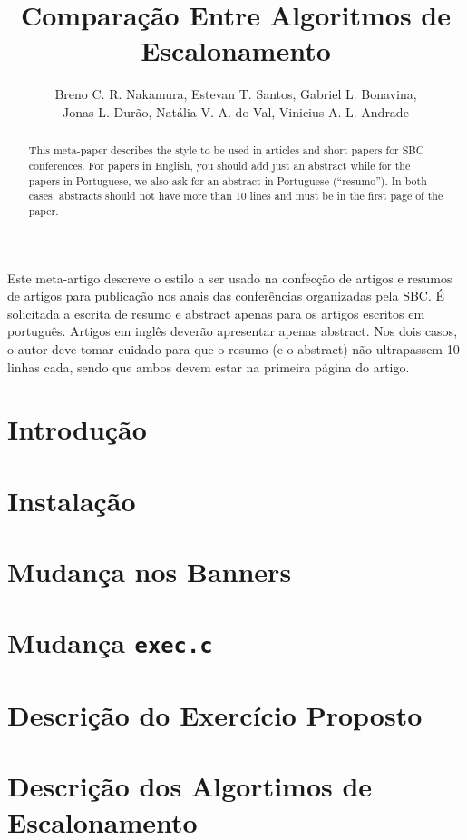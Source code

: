 \documentclass[12pt]{article}
\title{Comparação Entre Algoritmos de Escalonamento}
\author{Breno C. R. Nakamura\inst{1}, Estevan T. Santos\inst{1}, Gabriel L. Bonavina\inst{1}, \\
Jonas L. Durão\inst{1}, Natália V. A. do Val\inst{1}, Vinicius A. L. Andrade\inst{1}}
\begin{document}
 

\maketitle

\begin{abstract}
  This meta-paper describes the style to be used in articles and short papers
  for SBC conferences. For papers in English, you should add just an abstract
  while for the papers in Portuguese, we also ask for an abstract in
  Portuguese (``resumo''). In both cases, abstracts should not have more than
  10 lines and must be in the first page of the paper.
\end{abstract}
     
\begin{resumo} 
  Este meta-artigo descreve o estilo a ser usado na confecção de artigos e
  resumos de artigos para publicação nos anais das conferências organizadas
  pela SBC. É solicitada a escrita de resumo e abstract apenas para os artigos
  escritos em português. Artigos em inglês deverão apresentar apenas abstract.
  Nos dois casos, o autor deve tomar cuidado para que o resumo (e o abstract)
  não ultrapassem 10 linhas cada, sendo que ambos devem estar na primeira
  página do artigo.
\end{resumo}

\section{Introdução}

\section{Instalação}

\section{Mudança nos Banners}

\section{Mudança \texttt{exec.c}}

\section{Descrição do Exercício Proposto}

\section{Descrição dos Algortimos de Escalonamento}
\end{document}
